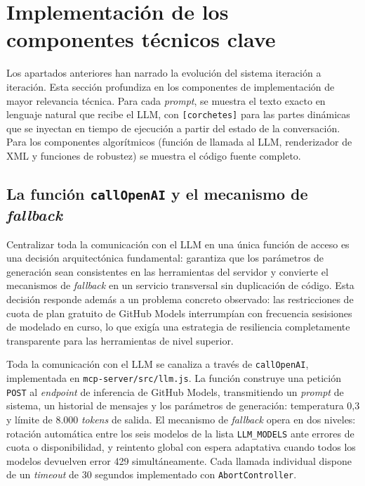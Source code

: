 \shorthandoff{<>}

\section{Implementación de los componentes técnicos clave}
\label{sec:componentesClave}

Los apartados anteriores han narrado la evolución del sistema iteración a iteración. Esta sección profundiza en los componentes de implementación de mayor relevancia técnica. Para cada \textit{prompt}, se muestra el texto exacto en lenguaje natural que recibe el LLM, con \texttt{[corchetes]} para las partes dinámicas que se inyectan en tiempo de ejecución a partir del estado de la conversación. Para los componentes algorítmicos (función de llamada al LLM, renderizador de XML y funciones de robustez) se muestra el código fuente completo.

\subsection{La función \texttt{callOpenAI} y el mecanismo de \textit{fallback}}
\label{subsec:callOpenAI}

Centralizar toda la comunicación con el LLM en una única función de acceso es una decisión arquitectónica fundamental: garantiza que los parámetros de generación sean consistentes en las herramientas del servidor y convierte el mecanismos de \textit{fallback} en un servicio transversal sin duplicación de código. Esta decisión responde además a un problema concreto observado: las restricciones de cuota de plan gratuito de GitHub Models interrumpían con frecuencia sesisiones de modelado en curso, lo que exigía una estrategia de resiliencia completamente transparente para las herramientas de nivel superior. 

Toda la comunicación con el LLM se canaliza a través de \texttt{callOpenAI}, implementada en \texttt{mcp-server/src/llm.js}. La función construye una petición \texttt{POST} al \textit{endpoint} de inferencia de GitHub Models, transmitiendo un \textit{prompt} de sistema, un historial de mensajes y los parámetros de generación: temperatura 0,3 y límite de 8.000 \textit{tokens} de salida. El mecanismo de \textit{fallback} opera en dos niveles: rotación automática entre los seis modelos de la lista \texttt{LLM\_MODELS} ante errores de cuota o disponibilidad, y reintento global con espera adaptativa cuando todos los modelos devuelven error 429 simultáneamente. Cada llamada individual dispone de un \textit{timeout} de 30 segundos implementado con \texttt{AbortController}.

